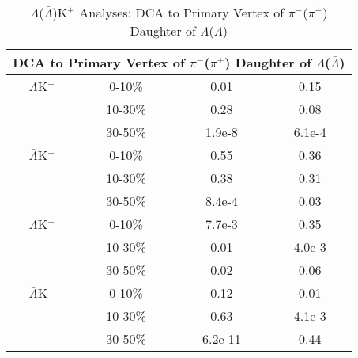 \documentclass[../AnalysisNoteJBuxton.tex]{subfiles}
\begin{document}
\begin{table}
 \centering
 \begin{tabular}{|c|c|c|c|}
 \multicolumn{4}{c}{DCA to Primary Vertex of $\pi^{-}$($\pi^{+}$) Daughter of $\Lambda$($\bar{\Lambda}$)} \\
  \hline
  $\Lambda$K$^{+}$ & 0-10\% & 0.01 & 0.15 \\
   & 10-30\% & 0.28 & 0.08 \\
   & 30-50\% & 1.9e-8 & 6.1e-4 \\
  \hline
  $\bar{\Lambda}$K$^{-}$ & 0-10\% & 0.55 & 0.36 \\
   & 10-30\% & 0.38 & 0.31 \\
   & 30-50\% & 8.4e-4 & 0.03 \\
  \hline \hline
  $\Lambda$K$^{-}$ & 0-10\% & 7.7e-3 & 0.35 \\
   & 10-30\% & 0.01 & 4.0e-3 \\
   & 30-50\% & 0.02 & 0.06 \\
  \hline
  $\bar{\Lambda}$K$^{+}$ & 0-10\% & 0.12 & 0.01 \\
   & 10-30\% & 0.63 & 4.1e-3 \\
   & 30-50\% & 6.2e-11 & 0.44 \\
  \hline
 \end{tabular}
 \caption{$\Lambda$($\bar{\Lambda}$)K$^{\pm}$ Analyses: DCA to Primary Vertex of $\pi^{-}$($\pi^{+}$) Daughter of $\Lambda$($\bar{\Lambda}$)}
 \label{tab:DcaToPrimVertexPionDaughtOfLamLamKch}
\end{table}
\end{document}
